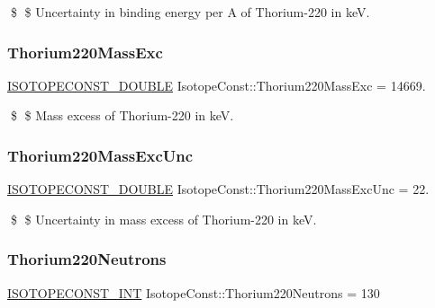 \$ \$ Uncertainty in binding energy per A of Thorium-\/220 in keV. \mbox{\label{group___isotope_const-_thorium-_th220_ga6dd991f883e9c8033c43bd1459366dfc}} 
\subsubsection{\texorpdfstring{Thorium220\+Mass\+Exc}{Thorium220MassExc}}
{\footnotesize\ttfamily \mbox{\hyperlink{group___isotope_const-_macros_ga8f45a7272ce02c0b4c65c44636ed719a}{I\+S\+O\+T\+O\+P\+E\+C\+O\+N\+S\+T\+\_\+\+D\+O\+U\+B\+LE}} Isotope\+Const\+::\+Thorium220\+Mass\+Exc = 14669.}

\$ \$ Mass excess of Thorium-\/220 in keV. \mbox{\label{group___isotope_const-_thorium-_th220_ga834d0f830e543274a711fe05883c407b}} 
\subsubsection{\texorpdfstring{Thorium220\+Mass\+Exc\+Unc}{Thorium220MassExcUnc}}
{\footnotesize\ttfamily \mbox{\hyperlink{group___isotope_const-_macros_ga8f45a7272ce02c0b4c65c44636ed719a}{I\+S\+O\+T\+O\+P\+E\+C\+O\+N\+S\+T\+\_\+\+D\+O\+U\+B\+LE}} Isotope\+Const\+::\+Thorium220\+Mass\+Exc\+Unc = 22.}

\$ \$ Uncertainty in mass excess of Thorium-\/220 in keV. \mbox{\label{group___isotope_const-_thorium-_th220_ga30dcb71cf8ebe4ae7393601c2d137f98}} 
\subsubsection{\texorpdfstring{Thorium220\+Neutrons}{Thorium220Neutrons}}
{\footnotesize\ttfamily \mbox{\hyperlink{group___isotope_const-_macros_ga5f18360b3e99483a35c32d789e62621c}{I\+S\+O\+T\+O\+P\+E\+C\+O\+N\+S\+T\+\_\+\+I\+NT}} Isotope\+Const\+::\+Thorium220\+Neutrons = 130}

